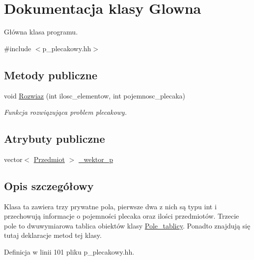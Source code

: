\hypertarget{class_glowna}{\section{\-Dokumentacja klasy \-Glowna}
\label{class_glowna}
}


\-Główna klasa programu.  




{\ttfamily \#include $<$p\-\_\-plecakowy.\-hh$>$}

\subsection*{\-Metody publiczne}
\begin{DoxyCompactItemize}
\item 
void \hyperlink{class_glowna_aa9f48516b27afdd8a6019c231c1de04a}{\-Rozwiaz} (int ilosc\-\_\-elementow, int pojemnosc\-\_\-plecaka)
\begin{DoxyCompactList}\small\item\em \-Funkcja rozwiązująca problem plecakowy. \end{DoxyCompactList}\end{DoxyCompactItemize}
\subsection*{\-Atrybuty publiczne}
\begin{DoxyCompactItemize}
\item 
vector$<$ \hyperlink{class_przedmiot}{\-Przedmiot} $>$ \hyperlink{class_glowna_aac69f912a28bec180c941cdb2cf2f73a}{\-\_\-wektor\-\_\-p}
\end{DoxyCompactItemize}


\subsection{\-Opis szczegółowy}
\-Klasa ta zawiera trzy prywatne pola, pierwsze dwa z nich są typu int i przechowują informacje o pojemności plecaka oraz ilości przedmiotów. \-Trzecie pole to dwuwymiarowa tablica obiektów klasy \hyperlink{class_pole__tablicy}{\-Pole\-\_\-tablicy}. \-Ponadto znajdują się tutaj deklaracje metod tej klasy. 

\-Definicja w linii 101 pliku p\-\_\-plecakowy.\-hh.



